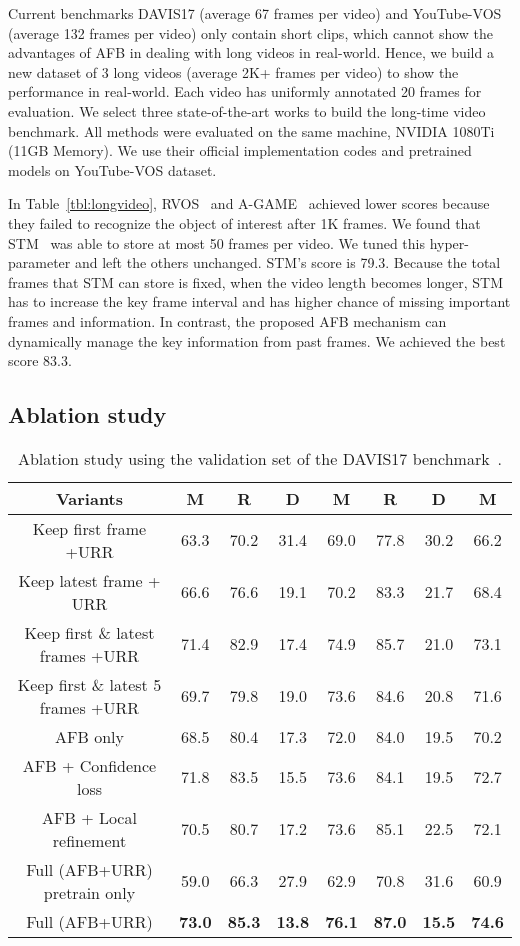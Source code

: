 \documentclass{article}
\begin{document}
Current benchmarks DAVIS17 (average 67 frames per video) and YouTube-VOS (average 132 frames per video) only contain short clips, which cannot show the advantages of AFB in dealing with long
videos in real-world.
Hence, we build a new dataset of 3 long videos (average 2K+ frames per video) to show the performance
in real-world.
Each video has uniformly annotated 20 frames for evaluation. 
We select three state-of-the-art works to build the long-time video benchmark.
All methods were evaluated on the same machine, NVIDIA 1080Ti (11GB Memory).
We use their official implementation codes and pretrained models on YouTube-VOS dataset.

In Table~\ref{tbl:longvideo}, RVOS~\cite{ventura2019rvos} and A-GAME~\cite{johnander2019generative} achieved lower scores because they failed to recognize the object of interest after 1K frames.
We found that STM~\cite{oh_video_2019} was able to store at most 50 frames per video. 
We tuned this hyper-parameter and left the others unchanged.
STM's  score is 79.3. 
Because the total frames that STM can store is fixed, when the video length becomes longer, STM has to increase the key frame interval and has higher chance of missing important frames and information. 
In contrast, the proposed AFB mechanism can dynamically manage the key information from past frames.
We achieved the best  score 83.3.

\subsection{Ablation study}
\begin{table}[h]
  \caption{Ablation study using the validation set of the DAVIS17 benchmark~\cite{pont-tuset_2017_2018}.}
  \label{tbl:ablation}
  \centering
  \begin{tabular}{c|cccccc|c}
        \toprule
        Variants &  M &  R &  D &  M &  R &  D &  M\\
        \midrule
        Keep first frame +URR   & 63.3 & 70.2 & 31.4 & 69.0 & 77.8 & 30.2 & 66.2 \\
        Keep latest frame + URR & 66.6 & 76.6 & 19.1 & 70.2 & 83.3 & 21.7 & 68.4 \\
        Keep first \& latest frames +URR  & 71.4 & 82.9 & 17.4 & 74.9 & 85.7 & 21.0 & 73.1 \\
        Keep first \& latest 5 frames +URR & 69.7 & 79.8 & 19.0 & 73.6 & 84.6 & 20.8 & 71.6 \\
        \midrule
        AFB only & 68.5 & 80.4 & 17.3 & 72.0 & 84.0 & 19.5 & 70.2\\
        AFB + Confidence loss   & 71.8 & 83.5 & 15.5 & 73.6 & 84.1 & 19.5 & 72.7\\
        AFB + Local refinement  & 70.5 & 80.7 & 17.2 & 73.6 & 85.1 & 22.5 & 72.1\\
        \midrule
        Full (AFB+URR) pretrain only & 59.0 & 66.3 & 27.9 & 62.9 & 70.8 & 31.6 & 60.9 \\
        Full (AFB+URR)      & \textbf{73.0} & \textbf{85.3} & \textbf{13.8} & \textbf{76.1} & \textbf{87.0} & \textbf{15.5} & \textbf{74.6} \\
        \bottomrule
    \end{tabular}
\end{table}
\end{document}
